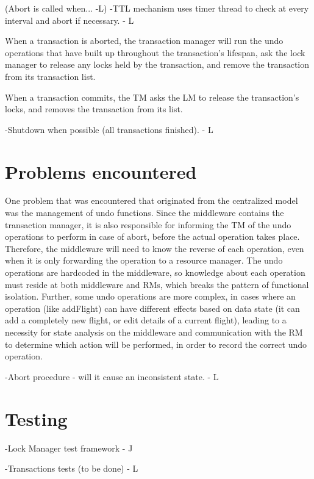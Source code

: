 \documentclass[11pt]{article}
\begin{document}
(Abort is called when... -L)
-TTL mechanism uses timer thread to check at every interval and abort if necessary. - L

When a transaction is aborted, the transaction manager will run the undo operations that have built up throughout the transaction's lifespan, ask the lock manager to release any locks held by the transaction, and remove the transaction from its transaction list.

When a transaction commits, the TM asks the LM to release the transaction's locks, and removes the transaction from its list.

-Shutdown when possible (all transactions finished). - L


\section*{Problems encountered}

One problem that was encountered that originated from the centralized model was the management of undo functions. Since the middleware contains the transaction manager, it is also responsible for informing the TM of the undo operations to perform in case of abort, before the actual operation takes place. Therefore, the middleware will need to know the reverse of each operation, even when it is only forwarding the operation to a resource manager. The undo operations are hardcoded in the middleware, so knowledge about each operation must reside at both middleware and RMs, which breaks the pattern of functional isolation. Further, some undo operations are more complex, in cases where an operation (like addFlight) can have different effects based on data state (it can add a completely new flight, or edit details of a current flight), leading to a necessity for state analysis on the middleware and communication with the RM to determine which action will be performed, in order to record the correct undo operation.

-Abort procedure - will it cause an inconsistent state. - L

\section*{Testing}

-Lock Manager test framework - J

-Transactions tests (to be done) - L
\end{document}
